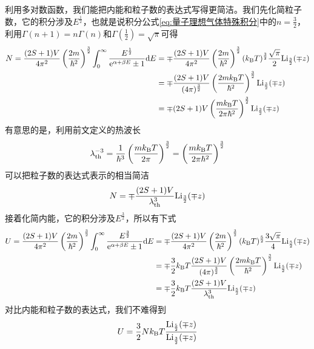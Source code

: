 \documentclass[../../main.tex]{subfiles}
\begin{document}
利用多对数函数，我们能把内能和粒子数的表达式写得更简洁。我们先化简粒子数，它的积分涉及\(E^{\frac{1}{2}}\)，也就是说积分公式\eqref{eq:量子理想气体特殊积分}中的\(n=\frac{3}{2}\)，利用\(\Gamma(n+1)=n\Gamma(n)\)和\(\Gamma\left(\frac{1}{2}\right)=\sqrt{\pi}\)可得
\begin{equation}
    \begin{split}
        N=\frac{(2S+1)V}{4\pi^2}\left(\frac{2m}{\hbar^2}\right)^{\frac{3}{2}}\int_0^{\infty}\frac{E^{\frac{1}{2}}}{\mathrm{e}^{\alpha+\beta E}\pm1}\dd E&=\mp\frac{(2S+1)V}{4\pi^2}\left(\frac{2m}{\hbar^2}\right)^{\frac{3}{2}}(k_{\mathrm{B}} T)^{\frac{3}{2}}\frac{\sqrt{\pi}}{2}\mathrm{Li}_{\frac{3}{2}}(\mp z) \\
        &=\mp\frac{(2S+1)V}{(4\pi)^{\frac{3}{2}}}\left(\frac{2mk_{\mathrm{B}} T}{\hbar^2}\right)^{\frac{3}{2}}\mathrm{Li}_{\frac{3}{2}}(\mp z) \\
        &=\mp(2S+1)V\left(\frac{mk_{\mathrm{B}} T}{2\pi\hbar^2}\right)^{\frac{3}{2}}\mathrm{Li}_{\frac{3}{2}}(\mp z)
    \end{split}
\end{equation}
有意思的是，利用前文定义的热波长
\begin{equation}
    \lambda_{\mathrm{th}}^{-3}=\frac{1}{\hbar^3}\left(\frac{mk_{\mathrm{B}} T}{2\pi}\right)^{\frac{3}{2}}=\left(\frac{mk_{\mathrm{B}} T}{2\pi\hbar^2}\right)^{\frac{3}{2}}
\end{equation}
可以把粒子数的表达式表示的相当简洁
\begin{equation}\label{eq:量子理想气体粒子数}
    N=\mp\frac{(2S+1)V}{\lambda_{\mathrm{th}}^{3}}\mathrm{Li}_{\frac{3}{2}}(\mp z)
\end{equation}
接着化简内能，它的积分涉及\(E^{\frac{3}{2}}\)，所以有下式
\begin{equation}\label{eq:量子理想气体内能原始公式}
    \begin{split}
        U=\frac{(2S+1)V}{4\pi^2}\left(\frac{2m}{\hbar^2}\right)^{\frac{3}{2}}\int_0^{\infty}\frac{E^{\frac{3}{2}}}{\mathrm{e}^{\alpha+\beta E}\pm1}\dd E&=\mp\frac{(2S+1)V}{4\pi^2}\left(\frac{2m}{\hbar^2}\right)^{\frac{3}{2}}(k_{\mathrm{B}} T)^{\frac{5}{2}}\frac{3\sqrt{\pi}}{4}\mathrm{Li}_{\frac{5}{2}}(\mp z) \\
        &=\mp\frac{3}{2}k_{\mathrm{B}} T\frac{(2S+1)V}{(4\pi)^{\frac{3}{2}}}\left(\frac{2mk_{\mathrm{B}} T}{\hbar^2}\right)^{\frac{3}{2}}\mathrm{Li}_{\frac{5}{2}}(\mp z) \\
        &=\mp\frac{3}{2}k_{\mathrm{B}} T\frac{(2S+1)V}{\lambda_{\mathrm{th}}^{3}}\mathrm{Li}_{\frac{5}{2}}(\mp z)
    \end{split}
\end{equation}
对比内能和粒子数的表达式，我们不难得到
\begin{equation}\label{eq:量子理想气体内能}
    U=\frac{3}{2}Nk_{\mathrm{B}} T\frac{\mathrm{Li}_{\frac{5}{2}}(\mp z)}{\mathrm{Li}_{\frac{3}{2}}(\mp z)}
\end{equation}
\end{document}
